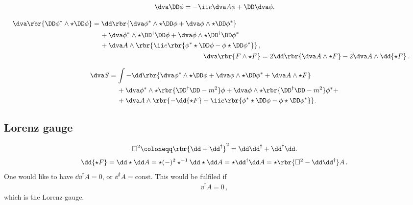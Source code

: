 \documentclass[a4paper]{article}
\numberwithin{equation}{subsection}
\begin{document}
\begin{align}
\dva \DD\phi = -\ii e \dva A\phi + \DD \dva \phi.
\end{align}

\begin{align}
\begin{split}
\dva\rbr{\DD \phi^*\wedge\star\DD\phi} &= 
\dd\rbr{\dva\phi^*\wedge\star\DD\phi + \dva\phi\wedge\star\DD\phi^*}
\\
&\quad\,+
\dva\phi^*\wedge\star\DD^{\dagger}\DD\phi +
\dva\phi\wedge\star\DD^{\dagger}\DD\phi^*
\\
&\quad\,+
\dva A \wedge\rbr{\ii e \rbr{\phi^* \star\DD\phi - \phi\star\DD\phi^*}}\,,
\end{split}
\\
\dva\rbr{F\wedge\star F} &=
	2 \dd\rbr{\dva A \wedge \star F} - 2 \dva A \wedge \dd {\star F}\,.
\end{align}

\begin{align}
\dva S &= \int -\dd\rbr{\dva\phi^*\wedge\star\DD\phi + \dva\phi\wedge\star\DD\phi^* + \dva A \wedge\star F}
\nonumber \\
&\quad\,+
\dva\phi^*\wedge\star\rbr{\DD^{\dagger}\DD-m^2}\phi +
\dva\phi\wedge\star\rbr{\DD^{\dagger}\DD-m^2}\phi^* +
\nonumber \\
&\quad\,+
\dva A\wedge\rbr{-\dd{\star F} +
	\ii e \rbr{\phi^* \star\DD\phi - \phi \star\DD\phi^*}}.
\end{align}

\subsection{Lorenz gauge}
\begin{align}
\square^2 \coloneqq \rbr{\dd + \dd^{\dagger}}^2 = \dd \dd^{\dagger} + \dd^{\dagger} \dd.
\end{align}
\begin{align}
\dd{\star F} = \dd\star \dd A = \star (-)^2 \star^{-1}\dd\star\dd A = \star \dd^{\dagger} \dd A = \star\rbr{\square^2 - \dd \dd^{\dagger}} A\,.
\end{align}
One would like to have $\dd \dd^{\dagger} A = 0$, or $\dd^{\dagger} A = \text{const}$. This would be fulfiled if
\begin{align}
\dd^{\dagger} A = 0\,,
\end{align}
which is the Lorenz gauge\cite{Lorenz1867,Bladel1991a,Bladel1991b}.

%


\end{document}
